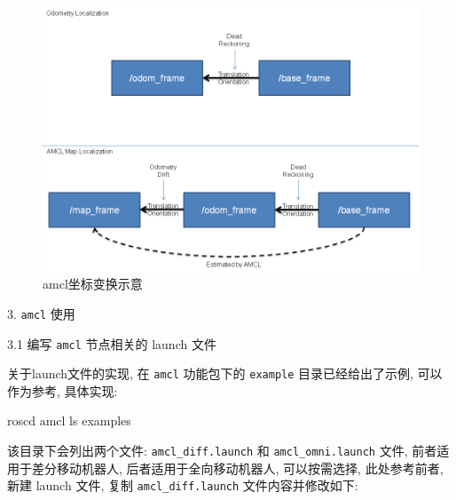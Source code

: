 \documentclass[openany, fontset=windowsold]{ctexbook}
\theoremstyle{kaiti}
\theoremstyle{normal}
\begin{document}
\begin{figure}[!ht]
  \centering
  \includegraphics[width=.9\textwidth]{ros_demo_nav_amcl_tf.png}
  \caption{amcl坐标变换示意}
  \label{fig:ros_demo_nav_amcl_tf}
\end{figure}

3. \verb|amcl| 使用

3.1 编写 \verb|amcl| 节点相关的 launch 文件

关于launch文件的实现, 在 \verb|amcl| 功能包下的 \verb|example| 目录已经给出了示例, 可以作为参考, 具体实现:

\begin{bash}
  roscd amcl
  ls examples
\end{bash}

该目录下会列出两个文件: \verb|amcl_diff.launch| 和 \verb|amcl_omni.launch| 文件, 前者适用于差分移动机器人, 后者适用于全向移动机器人, 可以按需选择, 此处参考前者, 新建 launch 文件, 复制 \verb|amcl_diff.launch| 文件内容并修改如下:
\end{document}
